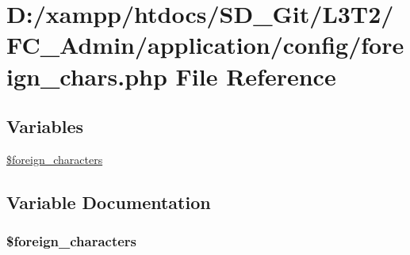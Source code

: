 \hypertarget{foreign__chars_8php}{}\section{D\+:/xampp/htdocs/\+S\+D\+\_\+\+Git/\+L3\+T2/\+F\+C\+\_\+\+Admin/application/config/foreign\+\_\+chars.php File Reference}
\label{foreign__chars_8php}
\subsection*{Variables}
\begin{DoxyCompactItemize}
\item 
\hyperlink{foreign__chars_8php_a77bf091eac4b63b8efea27293e5ca79b}{\$foreign\+\_\+characters}
\end{DoxyCompactItemize}


\subsection{Variable Documentation}
\hypertarget{foreign__chars_8php_a77bf091eac4b63b8efea27293e5ca79b}{}
\subsubsection[{\$foreign\+\_\+characters}]{\setlength{\rightskip}{0pt plus 5cm}\$foreign\+\_\+characters}\label{foreign__chars_8php_a77bf091eac4b63b8efea27293e5ca79b}
